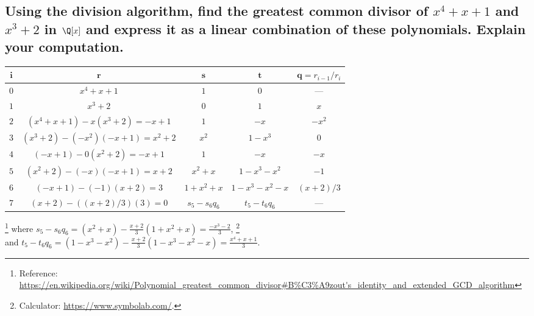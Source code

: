 \section[Problem 2]{}
    \subsection[(i)]{Using the division algorithm, find the greatest common divisor of $x^4 + x + 1$
        and $x^3 + 2$ in $\Q[x]$ and express it as a linear combination of these polynomials. 
        Explain your computation.}
        \begin{center}
            \begin{tabular}{|c|c|c|c|c|}
                \hline
                $\bm{i}$& $\bm{r}$          & $\bm{s}$  & $\bm{t}$  & $\bm{q} = r_{i-1} / r_i$ \\
                \hline
                $0$ & $x^4 + x + 1$                         & $1$  & $0$  & \----  \\
                \hline
                $1$ & $x^3 + 2$                             & $0$  & $1$  & $x$    \\
                \hline
                $2$ & $(x^4 + x + 1) - x(x^3 + 2) = -x+1$   & $1$  & $-x$  & $-x^2$ \\
                \hline
                $3$ & $(x^3 + 2) -(- x^2)(-x+1) = x^2 + 2$  & $x^2$& $1-x^3$  & $0$    \\
                \hline
                $4$ & $(-x+1) -0(x^2 + 2) = -x+1$           & $1$  & $-x$  & $-x$   \\
                \hline
                $5$ & $(x^2+2) - (-x)(-x+1) = x+2$          & $x^2+x$  & $1-x^3-x^2$  & $-1$   \\
                \hline
                $6$ & $(-x+1) - (-1)(x+2) = 3$              & $1+x^2+x$  & $1-x^3-x^2-x$   & $(x+2)/3$  \\
                \hline
                $7$ & $(x+2) - ((x+2)/3)(3) = 0$            & $s_5 - s_6q_6$  & $t_5 - t_6q_6$  & \----  \\
                \hline
            \end{tabular}
        \end{center}
        
        \footnote{Reference: \url{https://en.wikipedia.org/wiki/Polynomial_greatest_common_divisor\#B\%C3\%A9zout's_identity_and_extended_GCD_algorithm}}
        where
        $s_5 - s_6q_6 = (x^2+x) - \frac{x+2}{3}(1+x^2+x) = \frac{- x^3 - 2}{3}$, 
        \footnote{Calculator: \url{https://www.symbolab.com/}.}
        \\
        and 
        $t_5 - t_6q_6 = (1-x^3-x^2) - \frac{x+2}{3}(1-x^3-x^2 - x) = \frac{x^4+x+1}{3}$.

